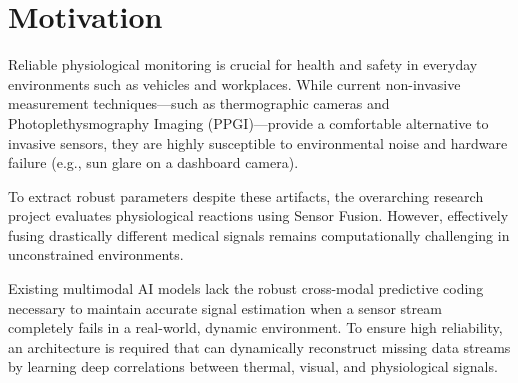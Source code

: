 	

	
	
	




\section{Motivation}

Reliable physiological monitoring is crucial for health and safety in everyday environments such as vehicles and workplaces. While current non-invasive measurement techniques---such as thermographic cameras and Photoplethysmography Imaging (PPGI)---provide a comfortable alternative to invasive sensors, they are highly susceptible to environmental noise and hardware failure (e.g., sun glare on a dashboard camera). 

To extract robust parameters despite these artifacts, the overarching research project evaluates physiological reactions using Sensor Fusion. However, effectively fusing drastically different medical signals remains computationally challenging in unconstrained environments.

Existing multimodal AI models lack the robust cross-modal predictive coding necessary to maintain accurate signal estimation when a sensor stream completely fails in a real-world, dynamic environment. To ensure high reliability, an architecture is required that can dynamically reconstruct missing data streams by learning deep correlations between thermal, visual, and physiological signals. 



